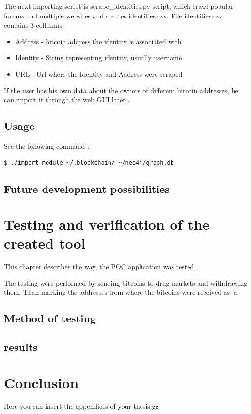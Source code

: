 \documentclass[
  digital, %
  table,   %
  lof,     %
  lot,     %
  oneside
]{fithesis3}
\begin{document}
The next importing script is scrape\_identities.py script, which crawl popular forums and multiple websites and creates 
identities.csv.
File identities.csv contains 3 collumns.
\begin{itemize}
  \item Address - bitcoin address the identity is associated with
  \item Identity - String representing identity, usually username
  \item URL - Url where the Identity and Address were scraped
\end{itemize}

If the user has his own data about the owners of different bitcoin addresses, he can import it through the web GUI later
.


\section{Usage}

\noindent See the following command :
\begin{lstlisting}[language=bash]
  $ ./import_module ~/.blockchain/ ~/neo4j/graph.db
\end{lstlisting}

\section{Future development possibilities}


\chapter{Testing and verification of the created tool}
This chapter describes the way, the POC application was tested.

The testing were performed by sending bitcoins to drug markets and withdrawing them.
Than marking the addresses from where the bitcoins were received as 'a
\section{Method of testing}
\section{results}



\chapter{Conclusion}

Here you can insert the appendices of your thesis.gg

\printbibliography
\end{document}

